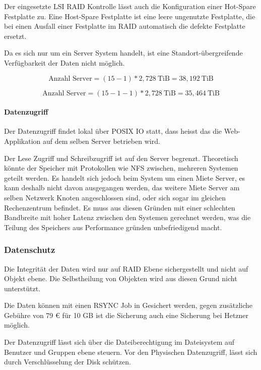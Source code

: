 Der eingesetzte LSI RAID Kontrolle lässt auch die Konfiguration einer Hot-Spare Festplatte zu. Eine Host-Spare Festplatte ist eine leere ungenutzte Festplatte, die bei einen Ausfall einer Festplatte im RAID automatisch die defekte Festplatte ersetzt. 

Da es sich nur um ein Server System handelt, ist eine Standort-übergreifende Verfügbarkeit der Daten nicht möglich.


\begin{equation}
\mbox{Anzahl Server} = (15 -1)* 2,728 \mathrm{\ TiB}=  38,192 \mathrm{\ TiB}
\label{eqn:MaxSpeicherkapazitätHeztner}
\end{equation}

\begin{equation}
\mbox{Anzahl Server} = (15 -1-1)* 2,728 \mathrm{\ TiB}=  35,464 \mathrm{\ TiB}
\label{eqn:MaxSpeicherkapazitätHeztnerHotspare}
\end{equation}

\paragraph*{Datenzugriff}
Der Datenzugriff findet lokal über POSIX IO statt, dass heisst das die Web-Applikation auf dem selben Server betrieben wird. 

Der Lese Zugriff und Schreibzugriff ist auf den Server begrenzt. Theoretisch könnte der Speicher mit Protokollen wie NFS zwischen, mehreren Systemen geteilt werden. Es handelt sich jedoch beim System um einen Miete Server, es kann deshalb nicht davon ausgegangen werden, das weitere Miete Server am selben Netzwerk Knoten angeschlossen sind, oder sich sogar im gleichen Rechenzentrum befindet. Es muss aus diesen Gründen mit einer schlechten Bandbreite mit hoher Latenz zwischen den Systemen gerechnet werden, was die Teilung des Speichers aus Performance gründen unbefriedigend macht.

\subsubsection{Datenschutz}
Die Integrität der Daten wird nur auf RAID Ebene sichergestellt und nicht auf Objekt ebene. Die Selbstheilung von Objekten wird aus diesen Grund nicht unterstützt.

Die Daten können mit einen RSYNC Job in Gesichert werden, gegen zusätzliche Gebühre von 79 € für 10 GB ist die Sicherung auch eine Sicherung bei Hetzner möglich.

Der Datenzugriff lässt sich über die Dateiberechtigung im Dateisystem auf Benutzer und Gruppen ebene steuern. Vor den Physischen Datenzugriff, lässt sich durch Verschlüsselung der Disk schützen.

